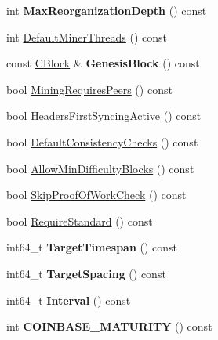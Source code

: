 \begin{DoxyCompactItemize}
int {\bfseries Max\+Reorganization\+Depth} () const
\item 
int \mbox{\hyperlink{class_c_chain_params_ac2da912493292c2139ca7753dde96b2e}{Default\+Miner\+Threads}} () const
\item 
\mbox{\label{class_c_chain_params_aebd6cb9d986eeb2e6c228c04b3c39b42}} 
const \mbox{\hyperlink{class_c_block}{C\+Block}} \& {\bfseries Genesis\+Block} () const
\item 
bool \mbox{\hyperlink{class_c_chain_params_a066ad4166984a31bdc0836193a6341ee}{Mining\+Requires\+Peers}} () const
\item 
bool \mbox{\hyperlink{class_c_chain_params_ae1bf9eed6ce76328909127bfc9965f76}{Headers\+First\+Syncing\+Active}} () const
\item 
bool \mbox{\hyperlink{class_c_chain_params_a1d12f9b4b1ea7d7a0416cb6045496342}{Default\+Consistency\+Checks}} () const
\item 
bool \mbox{\hyperlink{class_c_chain_params_ac1202f87305ff3fdd4e1da28f1b35218}{Allow\+Min\+Difficulty\+Blocks}} () const
\item 
bool \mbox{\hyperlink{class_c_chain_params_a79b6cb67af99906669f7219a14a83cf7}{Skip\+Proof\+Of\+Work\+Check}} () const
\item 
bool \mbox{\hyperlink{class_c_chain_params_a30c1b60e515537b01810e175844d852f}{Require\+Standard}} () const
\item 
\mbox{\label{class_c_chain_params_a31aee5a207f45026c08cc37f3a0f7b89}} 
int64\+\_\+t {\bfseries Target\+Timespan} () const
\item 
\mbox{\label{class_c_chain_params_a9c039f77ecdc58117dca0c6a5bae0dff}} 
int64\+\_\+t {\bfseries Target\+Spacing} () const
\item 
\mbox{\label{class_c_chain_params_aaf86b1e5312dea14645af764fc41be7f}} 
int64\+\_\+t {\bfseries Interval} () const
\item 
\mbox{\label{class_c_chain_params_ab752b3ae1230aaf40b5a2d14d628fab7}} 
int {\bfseries C\+O\+I\+N\+B\+A\+S\+E\+\_\+\+M\+A\+T\+U\+R\+I\+TY} () const
\item 
\mbox{\label{class_c_chain_params_a82190f02d83daee6823362e3c25848d0}} 

\end{DoxyCompactItemize}
